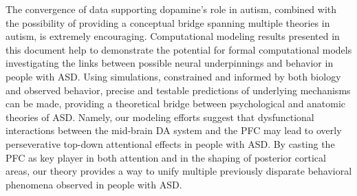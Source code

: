 The convergence of data supporting dopamine's role in autism, combined with the possibility of providing a conceptual bridge spanning multiple theories in autism, is extremely encouraging.  Computational modeling results presented in this document help to demonstrate the potential for formal computational models investigating the links between possible neural underpinnings and behavior in people with ASD.  Using simulations, constrained and informed by both biology and observed behavior, precise and testable predictions of underlying mechanisms can be made, providing a theoretical bridge between psychological and anatomic theories of ASD.   Namely, our modeling efforts suggest that dysfunctional interactions between the mid-brain DA system and the PFC may lead to overly perseverative top-down attentional effects in people with ASD.  By casting the PFC as key player in both attention and in the shaping of posterior cortical areas, our theory provides a way to unify multiple previously disparate behavioral phenomena observed in people with ASD.
